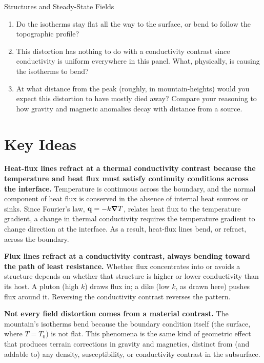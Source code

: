 \begin{activity}{Structures and Steady-State Fields}
\begin{questions}
\begin{enumerate}[label=(\alph*)]
    \item Do the isotherms stay flat all the way to the surface, or bend to follow the topographic profile?
    \answerbox[2.5cm]

    \item This distortion has nothing to do with a conductivity contrast since conductivity is uniform everywhere in this panel. What, physically, is causing the isotherms to bend?
    \answerbox[2cm]

    \item At what distance from the peak (roughly, in mountain-heights) would you expect this distortion to have mostly died away? Compare your reasoning to how gravity and magnetic anomalies decay with distance from a source.
    \answerbox[2cm]
\end{enumerate}

\end{questions}

\section*{Key Ideas}

\textbf{Heat-flux lines refract at a thermal conductivity contrast because the temperature and heat flux must satisfy continuity conditions across the interface.} Temperature is continuous across the boundary, and the normal component of heat flux is conserved in the absence of internal heat sources or sinks. Since Fourier's law, \(\vb{q} = -k \grad{T}\), relates heat flux to the temperature gradient, a change in thermal conductivity requires the temperature gradient to change direction at the interface. As a result, heat-flux lines bend, or refract, across the boundary.

\textbf{Flux lines refract at a conductivity contrast, always bending toward the path of least resistance.} Whether flux concentrates into or avoids a structure depends on whether that structure is higher or lower conductivity than its host. A pluton (high $k$) draws flux in; a dike (low $k$, as drawn here) pushes flux around it. Reversing the conductivity contrast reverses the pattern.

\textbf{Not every field distortion comes from a material contrast.} The mountain's isotherms bend because the boundary condition itself (the surface, where $T=T_0$) is not flat.  This phenomena is the same kind of geometric effect that produces terrain corrections in gravity and magnetics, distinct from (and addable to) any density, susceptibility, or conductivity contrast in the subsurface.

\end{activity}

